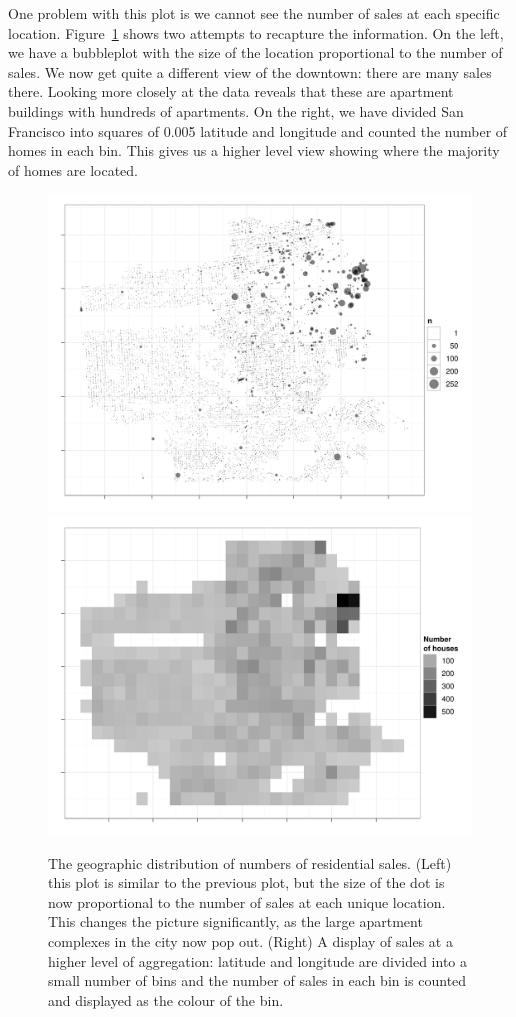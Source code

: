 \documentclass[oneside]{article}
\begin{document}
One problem with this plot is we cannot see the number of sales at each specific location. Figure~\ref{fig:sf-n} shows two attempts to recapture the information. On the left, we have a bubbleplot with the size of the location proportional to the number of sales. We now get quite a different view of the downtown: there are many sales there. Looking more closely at the data reveals that these are apartment buildings with hundreds of apartments. On the right, we have divided San Francisco into squares of 0.005 latitude and longitude and counted the number of homes in each bin. This gives us a higher level view showing where the majority of homes are located.

\begin{figure}[htbp]
  \centering
    \includegraphics[width=0.5\linewidth]{sf-geo-n}%
    \includegraphics[width=0.5\linewidth]{sf-bin-n}
  \caption{The geographic distribution of numbers of residential sales.  (Left) this plot is similar to the previous plot, but the size of the dot is now proportional to the number of sales at each unique location.  This changes the picture significantly, as the large apartment complexes in the city now pop out.  (Right) A display of sales at a higher level of aggregation: latitude and longitude are divided into a small number of bins and the number of sales in each bin is counted and displayed as the colour of the bin.}
  \label{fig:sf-n}
\end{figure}
\end{document}
